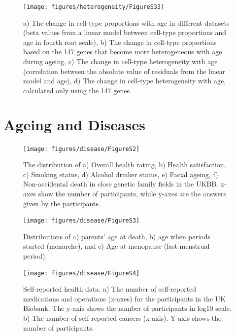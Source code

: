 \documentclass[12pt,twoside]{unicam}
\begin{document}
\begin{figure}

{\centering \texttt{[image: figures/heterogeneity/FigureS33]} 

}

\caption[Change in the cell type specific expression level and heterogeneity in datasets.]{a) The change in cell-type proportions with age in different datasets (beta values from a linear model between cell-type proportions and age in fourth root scale), b) The change in cell-type proportions based on the 147 genes that become more heterogeneous with age during ageing, c) The change in cell-type heterogeneity with age (correlation between the absolute value of residuals from the linear model and age), d) The change in cell-type heterogeneity with age, calculated only using the 147 genes.}\label{fig:hetFigS33}
\end{figure}
\newpage

\hypertarget{ageing-and-diseases-1}{%
\section{Ageing and Diseases}\label{ageing-and-diseases-1}}

\begin{figure}

{\centering \texttt{[image: figures/disease/FigureS2]} 

}

\caption[UK Biobank questionnaire responses.]{The distribution of a) Overall health rating, b) Health satisfaction, c) Smoking status, d) Alcohol drinker status, e) Facial ageing, f) Non-accidental death in close genetic family fields in the UKBB. x-axes show the number of participants, while y-axes are the answers given by the participants.}\label{fig:disFigS2}
\end{figure}

\begin{figure}

{\centering \texttt{[image: figures/disease/FigureS3]} 

}

\caption[Distributions of parents’ age at death, age at menarche, and age at menopause.]{Distributions of a) parents’ age at death, b) age when periods started (menarche), and c) Age at menopause (last menstrual period).}\label{fig:disFigS3}
\end{figure}

\begin{figure}

{\centering \texttt{[image: figures/disease/FigureS4]} 

}

\caption[Self-reported medications, operations, and cancers.]{Self-reported health data. a) The number of self-reported medications and operations (x-axes) for the participants in the UK Biobank. The y-axis shows the number of participants in log10 scale. b) The number of self-reported cancers (x-axis). Y-axis shows the number of participants.}\label{fig:disFigS4}
\end{figure}
\end{document}
